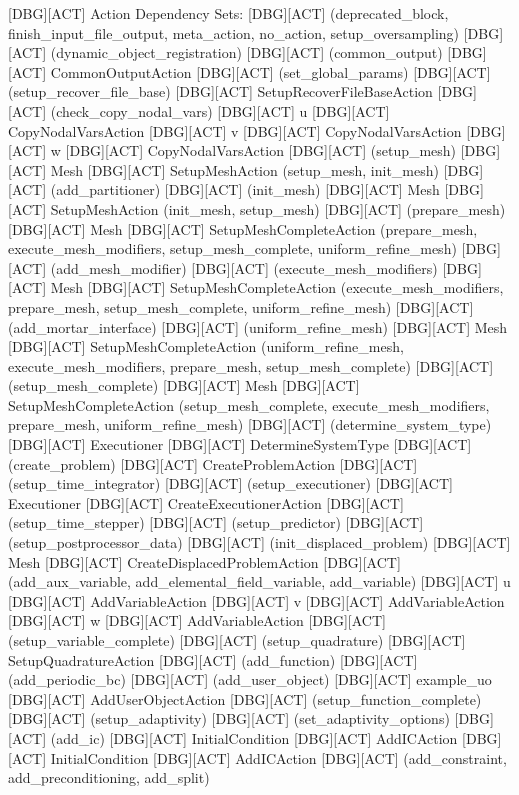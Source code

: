 {[DBG][ACT] Action Dependency Sets:
[DBG][ACT] (deprecated_block, finish_input_file_output, meta_action, no_action, setup_oversampling)
[DBG][ACT] (dynamic_object_registration)
[DBG][ACT] (common_output)
[DBG][ACT]	CommonOutputAction
[DBG][ACT] (set_global_params)
[DBG][ACT] (setup_recover_file_base)
[DBG][ACT]	SetupRecoverFileBaseAction
[DBG][ACT] (check_copy_nodal_vars)
[DBG][ACT]	u
[DBG][ACT]	CopyNodalVarsAction
[DBG][ACT]	v
[DBG][ACT]	CopyNodalVarsAction
[DBG][ACT]	w
[DBG][ACT]	CopyNodalVarsAction
[DBG][ACT] (setup_mesh)
[DBG][ACT]	Mesh
[DBG][ACT]	SetupMeshAction (setup_mesh, init_mesh)
[DBG][ACT] (add_partitioner)
[DBG][ACT] (init_mesh)
[DBG][ACT]	Mesh
[DBG][ACT]	SetupMeshAction (init_mesh, setup_mesh)
[DBG][ACT] (prepare_mesh)
[DBG][ACT]	Mesh
[DBG][ACT]	SetupMeshCompleteAction (prepare_mesh, execute_mesh_modifiers, setup_mesh_complete, uniform_refine_mesh)
[DBG][ACT] (add_mesh_modifier)
[DBG][ACT] (execute_mesh_modifiers)
[DBG][ACT]	Mesh
[DBG][ACT]	SetupMeshCompleteAction (execute_mesh_modifiers, prepare_mesh, setup_mesh_complete, uniform_refine_mesh)
[DBG][ACT] (add_mortar_interface)
[DBG][ACT] (uniform_refine_mesh)
[DBG][ACT]	Mesh
[DBG][ACT]	SetupMeshCompleteAction (uniform_refine_mesh, execute_mesh_modifiers, prepare_mesh, setup_mesh_complete)
[DBG][ACT] (setup_mesh_complete)
[DBG][ACT]	Mesh
[DBG][ACT]	SetupMeshCompleteAction (setup_mesh_complete, execute_mesh_modifiers, prepare_mesh, uniform_refine_mesh)
[DBG][ACT] (determine_system_type)
[DBG][ACT]	Executioner
[DBG][ACT]	DetermineSystemType
[DBG][ACT] (create_problem)
[DBG][ACT]	CreateProblemAction
[DBG][ACT] (setup_time_integrator)
[DBG][ACT] (setup_executioner)
[DBG][ACT]	Executioner
[DBG][ACT]	CreateExecutionerAction
[DBG][ACT] (setup_time_stepper)
[DBG][ACT] (setup_predictor)
[DBG][ACT] (setup_postprocessor_data)
[DBG][ACT] (init_displaced_problem)
[DBG][ACT]	Mesh
[DBG][ACT]	CreateDisplacedProblemAction
[DBG][ACT] (add_aux_variable, add_elemental_field_variable, add_variable)
[DBG][ACT]	u
[DBG][ACT]	AddVariableAction
[DBG][ACT]	v
[DBG][ACT]	AddVariableAction
[DBG][ACT]	w
[DBG][ACT]	AddVariableAction
[DBG][ACT] (setup_variable_complete)
[DBG][ACT] (setup_quadrature)
[DBG][ACT]	SetupQuadratureAction
[DBG][ACT] (add_function)
[DBG][ACT] (add_periodic_bc)
[DBG][ACT] (add_user_object)
[DBG][ACT]	example_uo
[DBG][ACT]	AddUserObjectAction
[DBG][ACT] (setup_function_complete)
[DBG][ACT] (setup_adaptivity)
[DBG][ACT] (set_adaptivity_options)
[DBG][ACT] (add_ic)
[DBG][ACT]	InitialCondition
[DBG][ACT]	AddICAction
[DBG][ACT]	InitialCondition
[DBG][ACT]	AddICAction
[DBG][ACT] (add_constraint, add_preconditioning, add_split)
}
